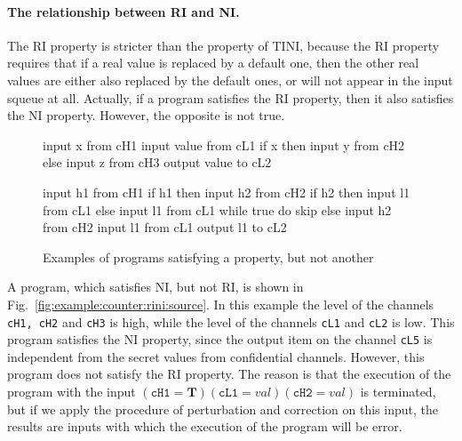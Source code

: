 \documentclass[10pt,a4paper,oneside]{article}
\def\VTRUE{\ensuremath{\textbf{T}}}
\def\valueM{\ensuremath{val}}
\def\linecode#1{{\texttt{#1}}}
\begin{document}
\paragraph{The relationship between RI and NI.}\label{sec:discussion:relationship:rini}
The RI property is stricter than the property of TINI, because the RI property requires that if a real value is replaced by a default one, then the other real values are either also replaced by the default ones, or will not appear in the input squeue at all. Actually, if a program satisfies the RI property, then it also satisfies the NI property. However, the opposite is not true.

\begin{figure}
\centering
\begin{lrbox}{\mylistingbox}\begin{minipage}{0.37\textwidth}
\vspace{55pt}
\begin{javascript}
input x from cH1
input value from cL1
if x then
    input y from cH2
else
    input z from cH3
output value to cL2
\end{javascript}
\end{minipage}
\end{lrbox}
 \hspace{10pt}
\begin{lrbox}{\mylistingbox}\begin{minipage}{0.37 \textwidth}
\begin{javascript}
input h1 from cH1
if h1 then
    input h2 from cH2
    if h2 then
        input l1 from cL1
    else
        input l1 from cL1
        while true do skip
else
    input h2 from cH2
    input l1 from cL1
output l1 to cL2
\end{javascript}
\end{minipage}
\end{lrbox}
\caption{Examples of programs satisfying a property, but not another}
\label{fig:example:counter:source}
\end{figure}

A program, which satisfies NI, but not RI, is shown in  Fig.~\ref{fig:example:counter:rini:source}. In this example the level of the channels \linecode{cH1, cH2} and \linecode{cH3} is high, while the level of the channels \linecode{cL1} and \linecode{cL2} is low. This program satisfies the NI property, since the output item on the channel \linecode{cL5} is independent from the secret values from confidential channels. However, this program does not satisfy the RI property. The reason is that the execution of the program with the input $(\linecode{cH1}=\VTRUE) (\linecode{cL1}=\valueM)(\linecode{cH2}=\valueM)$ is terminated, but if we apply the procedure of perturbation and correction on this input, the results are inputs with which the execution of the program will be error.
\end{document}
